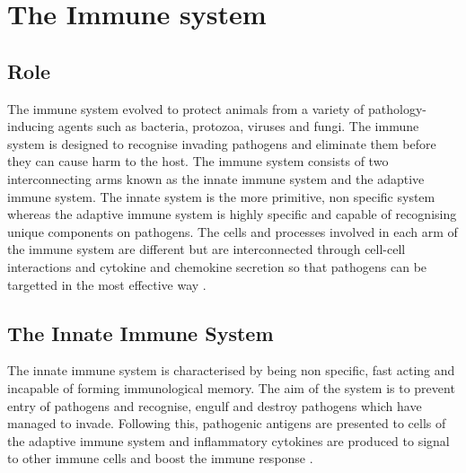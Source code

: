 





\section{The Immune system}
\subsection{Role}

The immune system evolved to protect animals from a variety of pathology-inducing agents such as bacteria, protozoa, viruses and fungi.
The immune system is designed to recognise invading pathogens and eliminate them before they can cause harm to the host.
The immune system consists of two interconnecting arms known as the innate immune system and the adaptive immune system.
The innate system is the more primitive, non specific system whereas the adaptive immune system is highly specific and capable of recognising unique components on pathogens.
The cells and processes involved in each arm of the immune system are different but are interconnected through cell-cell interactions and cytokine and chemokine secretion so that pathogens can be targetted in the most effective way \citep{KubyImmunology, Janeway2001, Parkin2001}.

\subsection{The Innate Immune System}

The innate immune system is characterised by being non specific, fast acting and incapable of forming immunological memory.
The aim of the system is to prevent entry of pathogens and recognise, engulf and destroy pathogens which have managed to invade.
Following this, pathogenic antigens are presented to cells of the adaptive immune system and inflammatory cytokines are produced to signal to other immune cells and boost the immune response \citep{Janeway2001}.

